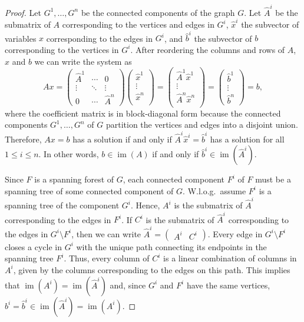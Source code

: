 \documentclass[english,a4paper,nolineno,cleveref]{socg-lipics-v2021}
\DeclareMathOperator{\im}{im}
\begin{document}
\begin{proof}
Let $G^1,\ldots,G^n$ be the connected components of the graph $G$. Let $\hat{A}^i$ be the submatrix of $A$ corresponding to the vertices and edges in $G^i$, $\hat{x}^i$ the subvector of variables $x$ corresponding to the edges in $G^i$, and $\hat{b}^i$ the subvector of $b$ corresponding to the vertices in $G^i$. After reordering the columns and rows of $A$, $x$ and $b$ we can write the system as
\begin{equation*}
Ax=
\begin{pmatrix}
\hat{A}^1 & \cdots & 0 \\
\vdots & \ddots & \vdots \\
0 & \cdots & \hat{A}^n
\end{pmatrix}
\begin{pmatrix}
\hat{x}^1 \\
\vdots \\
\hat{x}^n \\
\end{pmatrix}=
\begin{pmatrix}
\hat{A}^1\hat{x}^1 \\
\vdots \\
\hat{A}^n\hat{x}^n \\
\end{pmatrix}=
\begin{pmatrix}
\hat{b}^1 \\
\vdots \\
\hat{b}^n 
\end{pmatrix}=b ,
\end{equation*}
where the coefficient matrix is in block-diagonal form because the connected components $G^1,\ldots,G^n$ of $G$ partition the vertices and edges into a disjoint union. Therefore, $Ax=b$ has a solution if and only if $\hat{A}^i\hat{x}^i=\hat{b}^i$ has a solution for all $1\leq i\leq n$. In other words, $b\in\im(A)$ if and only if $\hat{b}^i\in\im(\hat{A}^i)$. 

Since $F$ is a spanning forest of $G$, each connected component $F^i$ of $F$ must be a spanning tree of some connected component of $G$. W.l.o.g.\ assume $F^i$ is a spanning tree of the component $G^i$. Hence, $A^i$ is the submatrix of $\hat{A}^i$ corresponding to the edges in $F^i$. If $C^i$ is the submatrix of $\hat{A}^i$ corresponding to the edges in $G^i\setminus F^i$, then we can write $\hat{A}^i=\begin{pmatrix}A^i & C^i \end{pmatrix}$. Every edge in $G^i\setminus F^i$ closes a cycle in $G^i$ with the unique path connecting its endpoints in the spanning tree $F^i$. Thus, every column of $C^i$ is a linear combination of columns in $A^i$, given by the columns corresponding to the edges on this path. This implies that $\im(A^i)=\im(\hat{A}^i)$ and, since $G^i$ and $F^i$ have the same vertices, $b^i=\hat{b}^i\in \im(\hat{A}^i)=\im(A^i)$.  


\end{proof}
\end{document}
